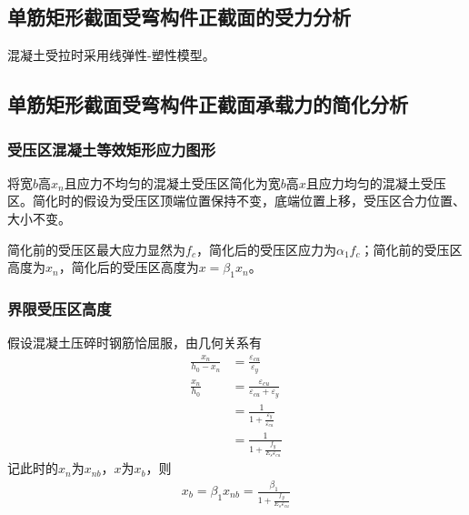 \documentclass{article}
\begin{document}
\subsection{单筋矩形截面受弯构件正截面的受力分析}
\par 混凝土受拉时采用线弹性-塑性模型。
\subsection{单筋矩形截面受弯构件正截面承载力的简化分析}\label{sec:SRB}
\subsubsection{受压区混凝土等效矩形应力图形}
\par 将宽$b$高$x_n$且应力不均匀的混凝土受压区简化为宽$b$高$x$且应力均匀的混凝土受压区。简化时的假设为受压区顶端位置保持不变，底端位置上移，受压区合力位置、大小不变。
\par 简化前的受压区最大应力显然为$f_c$，简化后的受压区应力为$\alpha_1f_c$；简化前的受压区高度为$x_n$，简化后的受压区高度为$x=\beta_1x_n$。
\subsubsection{界限受压区高度}
\par 假设混凝土压碎时钢筋恰屈服，由几何关系有
\begin{align*}
      \frac{x_n}{h_0-x_n} & = \frac{\varepsilon_{cu}}{\varepsilon_y}                  \\
      \frac{x_n}{h_0}     & = \frac{\varepsilon_{cu}}{\varepsilon_{cu}+\varepsilon_y} \\
                          & = \frac{1}{1+\frac{\varepsilon_y}{\varepsilon_{cu}}}      \\
                          & = \frac{1}{1+\frac{f_y}{E_s\varepsilon_{cu}}}
\end{align*}
记此时的$x_n$为$x_{nb}$，$x$为$x_b$，则
\begin{align}
      x_b = \beta_1x_{nb}=\frac{\beta_1}{1+\frac{f_y}{E_s\varepsilon_{cu}}}
\end{align}
\end{document}
